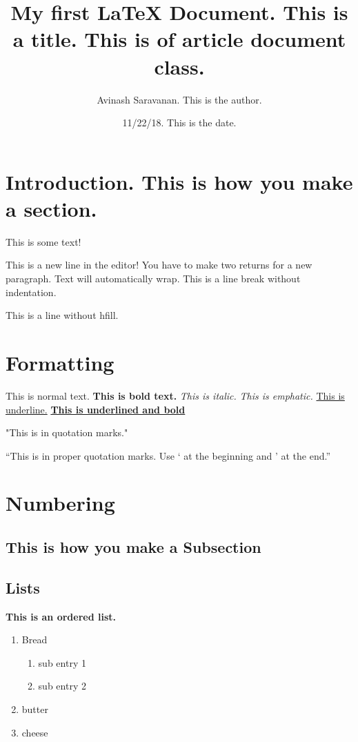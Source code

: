 \documentclass{article}
\author{Avinash Saravanan. This is the author.}
\title{My first {\LaTeX} Document. This is a title. This is of article document class. }
\date{11/22/18. This is the date.}
\begin{document}
\maketitle

\section{Introduction. This is how you make a section. }

This is some text!

This is a new line in the editor! You have to make two returns for a new paragraph. Text will automatically wrap.\hfill \break
This is a line break without indentation.

This is a line without hfill. \break

\section{Formatting}

This is normal text.
\textbf{This is bold text.}
\textit{This is italic.}
\emph{This is emphatic.}
\underline{This is underline.}
\underline{\textbf{This is underlined and bold}}


"This is in quotation marks."

``This is in proper quotation marks. Use ` at the beginning and ' at the end.''

\section {Numbering\label{numbering}}

\subsection{This is how you make a Subsection}
\subsection{Lists}
\textbf{This is an ordered list.}
\begin{enumerate}
\item Bread\label{bread}
\begin{enumerate}
\item sub entry 1
\item sub entry 2
\end {enumerate}
\item butter
\item cheese
\end{enumerate}
\end{document}
